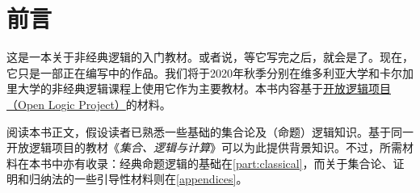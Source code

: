 
\chapter{前言}

这是一本关于非经典逻辑的入门教材。或者说，等它写完之后，就会是了。现在，它只是一部正在编写中的作品。我们将于2020年秋季分别在维多利亚大学和卡尔加里大学的非经典逻辑课程上使用它作为主要教材。本书内容基于\href{https://openlogicproject.org}{开放逻辑项目（Open Logic Project）}的材料。

阅读本书正文，假设读者已熟悉一些基础的集合论及（命题）逻辑知识。基于同一开放逻辑项目的教材《\emph{集合、逻辑与计算}》可以为此提供背景知识。不过，所需材料在本书中亦有收录：经典命题逻辑的基础在\cref{part:classical}，而关于集合论、证明和归纳法的一些引导性材料则在\cref{appendices}。